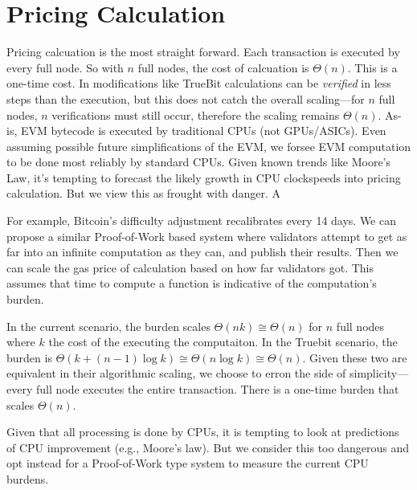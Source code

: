 \documentclass[12pt, final]{article}
\begin{document}
\section{Pricing Calculation}
\label{sect:calculation}



Pricing calcuation is the most straight forward.  Each transaction is executed by every full node.  So with $n$ full nodes, the cost of calcuation is $\Theta(n)$.  This is a one-time cost.  In modifications like TrueBit\cite{truebit} calculations can be \emph{verified} in less steps than the execution, but this does not catch the overall scaling---for $n$ full nodes, $n$ verifications must still occur, therefore the scaling remains $\Theta(n)$.  As-is, EVM bytecode is executed by traditional CPUs (not GPUs/ASICs).  Even assuming possible future simplifications of the EVM, we forsee EVM computation to be done most reliably by standard CPUs.  Given known trends like Moore's Law, it's tempting to forecast the likely growth in CPU clockspeeds into pricing calculation.  But we view this as frought with danger.  A 

For example, Bitcoin's difficulty adjustment recalibrates every 14 days.  We can propose a similar Proof-of-Work based system where validators attempt to get as far into an infinite computation as they can, and publish their results.  Then we can scale the gas price of calculation based on how far validators got.  This assumes that time to compute a function is indicative of the computation's burden.


In the current scenario, the burden scales $\Theta( n k ) \cong \Theta(n)$ for $n$ full nodes where $k$ the cost of the executing the computaiton.  In the Truebit scenario, the burden is $\Theta( k + (n-1) \log k) \cong \Theta( n \log k ) \cong \Theta( n )$.  Given these two are equivalent in their algorithmic scaling, we choose to erron the side of simplicity---every full node executes the entire transaction.  There is a one-time burden that scales $\Theta(n)$.

Given that all processing is done by CPUs, it is tempting to look at predictions of CPU improvement (e.g., Moore's law).  But we consider this too dangerous and opt instead for a Proof-of-Work type system to measure the current CPU burdens.

\end{document}
